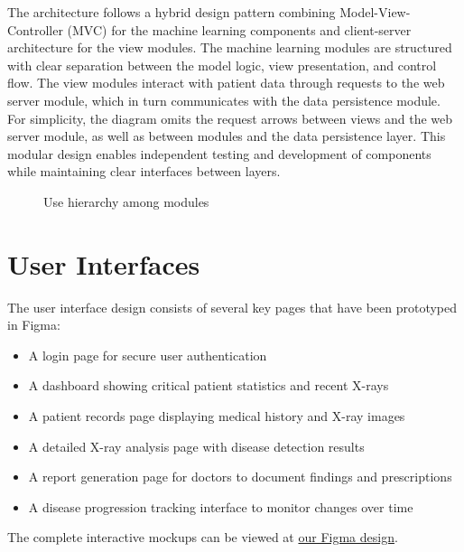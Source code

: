 \documentclass[12pt, titlepage]{article}
\begin{document}
\noindent The architecture follows a hybrid design pattern combining Model-View-Controller (MVC) for the machine learning components and client-server architecture for the view modules. The machine learning modules are structured with clear separation between the model logic, view presentation, and control flow. The view modules interact with patient data through requests to the web server module, which in turn communicates with the data persistence module. For simplicity, the diagram omits the request arrows between views and the web server module, as well as between modules and the data persistence layer. This modular design enables independent testing and development of components while maintaining clear interfaces between layers.


\begin{figure}[H]
\centering
\caption{Use hierarchy among modules}
\label{FigUH}
\end{figure}


\section{User Interfaces}
The user interface design consists of several key pages that have been prototyped in Figma:

\begin{itemize}
\item A login page for secure user authentication
\item A dashboard showing critical patient statistics and recent X-rays
\item A patient records page displaying medical history and X-ray images
\item A detailed X-ray analysis page with disease detection results
\item A report generation page for doctors to document findings and prescriptions
\item A disease progression tracking interface to monitor changes over time
\end{itemize}

The complete interactive mockups can be viewed at \href{https://www.figma.com/design/HAjX8dhwPjPSzX2Wz06YQ2/Capstone-App?node-id=134-122&t=8ET1qlba7wlarEvq-0}{our Figma design}.
\end{document}
